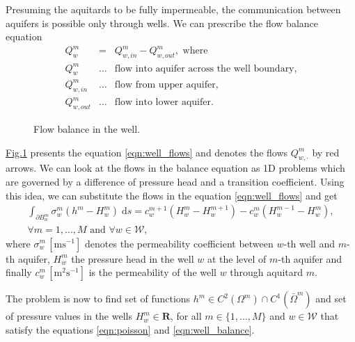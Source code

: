 \documentclass[preprint,12pt]{elsarticle}
\newcommand{\fig}[1]{\hyperref[#1]{Fig.\ref{#1}}}
\newcommand{\figpath}{../graphics/}
\newcommand{\dd}{\; \mathrm{d}}
\newcommand{\R}{\mathbf{R}}
\begin{document}
Presuming the aquitards to be fully impermeable, the communication between aquifers is possible only through 
wells. We can prescribe the flow balance equation 
\begin{eqnarray}
  Q^m_w &=& Q^m_{w,in} - Q^m_{w,out}, \textrm{ where} \label{eqn:well_flows} \\
  Q^m_w &\ldots& \textrm{flow into aquifer across the well boundary,} \nonumber\\
  Q^m_{w,in} &\ldots& \textrm{flow from upper aquifer,} \nonumber\\
  Q^m_{w,out} &\ldots& \textrm{flow into lower aquifer.} \nonumber
\end{eqnarray}
\begin{figure}[!htb]
  \begin{center}         
    \def\svgwidth{0.5\textwidth}
    
  \end{center}
  \caption{Flow balance in the well.}
  \label{fig:well_flows}
\end{figure}

\fig{fig:well_flows} presents the equation \eqref{eqn:well_flows} and denotes the flows $Q^m_{w,\cdot}$ by red arrows.
We can look at the flows in the balance equation as 1D problems which are governed by a difference of pressure
head and a transition coefficient. Using this idea, we can substitute the flows in the equation 
\eqref{eqn:well_flows} and get
\begin{eqnarray} 
\int_{\partial B_w^m}\sigma_w^m \left(h^m - H_w^m\right) \dd s
  = c_w^{m+1}\left( H^m_w-H_w^{m+1}\right) - c^m_w\left( H^{m-1}_w-H^m_w \right), \label{eqn:well_balance} \\
 \forall m=1,\dots,M \textrm{ and } \forall w\in\mathcal{W}, \nonumber
\end{eqnarray}
where $\sigma^m_w\, [\textrm{m}\textrm{s}^{-1}]$ denotes the permeability coefficient between $w$-th well and 
$m$-th aquifer, $H_w^m$ the pressure head in the well $w$ at the level of $m$-th aquifer and finally 
$c^m_w\, [\textrm{m}^2\textrm{s}^{-1}]$ is the permeability of the well $w$ through aquitard $m$.

The problem is now to find set of functions $h^m\in C^2(\Omega^m)\cap{C}^1(\bar\Omega^m)$ and set of pressure 
values in the wells $H^m_w\in\R$, for all $m\in\{1,\ldots,M\}$ and $w\in\mathcal{W}$ that
satisfy the equations \eqref{eqn:poisson} and \eqref{eqn:well_balance}.
\end{document}
